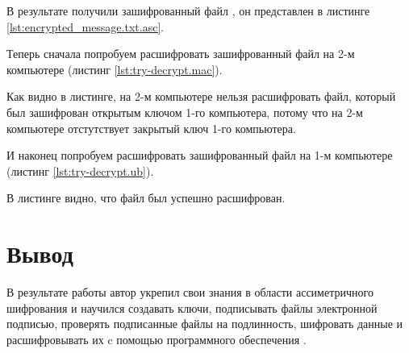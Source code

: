 



В результате получили зашифрованный файл , он представлен в листинге \ref{lst:encrypted_message.txt.asc}.



Теперь сначала попробуем расшифровать зашифрованный файл на 2-м компьютере (листинг \ref{lst:try-decrypt.mac}).



Как видно в листинге, на 2-м компьютере нельзя расшифровать файл, который был зашифрован открытым ключом 1-го компьютера, потому что на 2-м компьютере отстутствует закрытый ключ 1-го компьютера.

И наконец попробуем расшифровать зашифрованный файл на 1-м компьютере (листинг \ref{lst:try-decrypt.ub}).



В листинге видно, что файл был успешно расшифрован.


\section{Вывод}

В результате работы автор укрепил свои знания в области ассиметричного шифрования и научился создавать  ключи, подписывать файлы электронной подписью, проверять подписанные файлы на подлинность, шифровать данные и расшифровывать их c помощью программного обеспечения .


